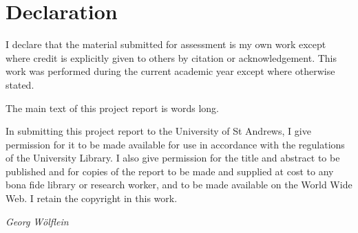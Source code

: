 \documentclass[../main.tex]{subfiles}
\begin{document}
\chapter*{Declaration}
I declare that the material submitted for assessment is my own work except where credit is explicitly given to others by citation or acknowledgement.
This work was performed during the current academic year except where otherwise stated.

The main text of this project report is \wordcount words long.

In submitting this project report to the University of St Andrews, I give permission for it to be made available for use in accordance with the regulations of the University Library. 
I also give permission for the title and abstract to be published and for copies of the report to be made and supplied at cost to any bona fide library or research worker, and to be made available on the World Wide Web.
I retain the copyright in this work.

\vspace{0.5cm}

\emph{Georg Wölflein}
\end{document}
